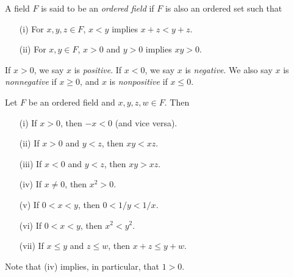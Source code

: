 \documentclass[../main.tex]{subfiles}
\begin{document}
\begin{definition}\label{def:ordered_field}
A field \( F \) is said to be an \textit{ordered field} if \( F \) is also an ordered set such that
\begin{itemize}
    \item[(i)] For \( x, y, z \in F \), \( x < y \) implies \( x + z < y + z \).
    \item[(ii)] For \( x, y \in F \), \( x > 0 \) and \( y > 0 \) implies \( xy > 0 \).
\end{itemize}
If \( x > 0 \), we say \( x \) is \textit{positive}. If \( x < 0 \), we say \( x \) is \textit{negative}. We also say \( x \) is \textit{nonnegative} if \( x \geq 0 \), and \( x \) is \textit{nonpositive} if \( x \leq 0 \).
\end{definition}
















\begin{proposition} \label{prop:ordered_field_properties}
Let \( F \) be an ordered field and \( x, y, z, w \in F \). Then
\begin{itemize}
    \item[(i)] If \( x > 0 \), then \( -x < 0 \) (and vice versa).
    \item[(ii)] If \( x > 0 \) and \( y < z \), then \( xy < xz \).
    \item[(iii)] If \( x < 0 \) and \( y < z \), then \( xy > xz \).
    \item[(iv)] If \( x \neq 0 \), then \( x^2 > 0 \).
    \item[(v)] If \( 0 < x < y \), then \( 0 < 1/y < 1/x \).
    \item[(vi)] If \( 0 < x < y \), then \( x^2 < y^2 \).
    \item[(vii)] If \( x \leq y \) and \( z \leq w \), then \( x + z \leq y + w \).
\end{itemize}
Note that (iv) implies, in particular, that \( 1 > 0 \).\\
\end{proposition}
\end{document}
